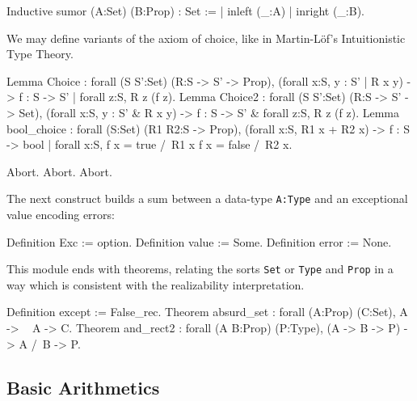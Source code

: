 \begin{coq_example*}
Inductive sumor (A:Set) (B:Prop) : Set :=
| inleft (_:A)
| inright (_:B).
\end{coq_example*}

We may define variants of the axiom of choice, like in Martin-Löf's
Intuitionistic Type Theory.

\begin{coq_example*}
Lemma Choice :
 forall (S S':Set) (R:S -> S' -> Prop),
   (forall x:S, {y : S' | R x y}) ->
   {f : S -> S' | forall z:S, R z (f z)}.
Lemma Choice2 :
 forall (S S':Set) (R:S -> S' -> Set),
   (forall x:S, {y : S' &  R x y}) ->
   {f : S -> S' &  forall z:S, R z (f z)}.
Lemma bool_choice :
 forall (S:Set) (R1 R2:S -> Prop),
   (forall x:S, {R1 x} + {R2 x}) ->
   {f : S -> bool |
   forall x:S, f x = true /\ R1 x \/ f x = false /\ R2 x}.
\end{coq_example*}
\begin{coq_eval}
Abort.
Abort.
Abort.
\end{coq_eval}

The next construct builds a sum between a data-type \verb|A:Type| and
an exceptional value encoding errors:


\begin{coq_example*}
Definition Exc := option.
Definition value := Some.
Definition error := None.
\end{coq_example*}


This module ends with theorems,
relating the sorts \verb:Set: or \verb:Type: and
\verb:Prop: in a way which is consistent with the realizability
interpretation.

\begin{coq_example*}
Definition except := False_rec.
Theorem absurd_set : forall (A:Prop) (C:Set), A -> ~ A -> C.
Theorem and_rect2 :
 forall (A B:Prop) (P:Type), (A -> B -> P) -> A /\ B -> P.
\end{coq_example*}

\subsection{Basic Arithmetics}

